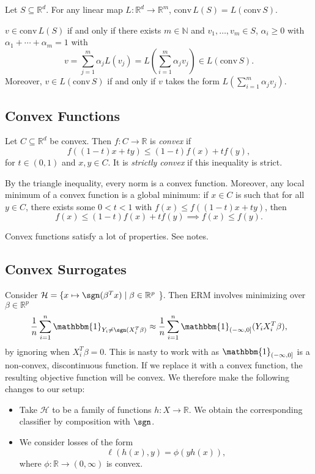 \documentclass[12pt]{article}
\begin{document}
\begin{lemma}
Let $S \subseteq \mathbb{R}^d$. For any linear map $L : \mathbb{R}^d \to \mathbb{R}^m$, $\mathrm{conv} \, L(S) = L(\mathrm{conv} \, S)$.
\end{lemma}

\begin{proofbox}
	$v \in \mathrm{conv} \, L(S)$ if and only if there exists $m \in \mathbb{N}$ and $v_1, \ldots, v_m \in S$, $\alpha_i \geq 0$ with $\alpha_1 + \cdots + \alpha_m = 1$ with
	\[
	v = \sum_{j = 1}^m \alpha_j L(v_j) = L \left( \sum_{i = 1}^m \alpha_j v_j \right) \in L(\mathrm{conv} \, S).
	\]
	Moreover, $v \in L(\mathrm{conv} \, S)$ if and only if $v$ takes the form $L(\sum_{i = 1}^m \alpha_j v_j)$.
\end{proofbox}

\subsection{Convex Functions}
\label{sub:convf}

Let $C \subseteq \mathbb{R}^d$ be convex. Then $f : C \to \mathbb{R}$ is \emph{convex} if
\[
f( (1 - t) x + t y) \leq (1 - t) f(x) + t f(y),
\]
for $t \in (0, 1)$ and $x, y \in C$. It is \emph{strictly convex} if this inequality is strict.

By the triangle inequality, every norm is a convex function. Moreover, any local minimum of a convex function is a global minimum: if $x \in C$ is such that for all $y \in C$, there exists some $0 < t < 1$ with $f(x) \leq f((1 - t)x + ty)$, then
\[
f(x) \leq (1 - t)f(x) + t f(y) \implies f(x) \leq f(y).
\]

Convex functions satisfy a lot of properties. See notes.

\subsection{Convex Surrogates}
\label{sub:conv_s}

Consider $\mathcal{H} = \{x \mapsto \sgn(\beta^T x)  \mid \beta \in \mathbb{R}^p$ \}. Then ERM involves minimizing over $\beta \in \mathbb{R}^p$
\[
	\frac{1}{n} \sum_{i = 1}^n \mathbbm{1}_{Y_i \neq \sgn (X_i^T \beta)} \approx \frac{1}{n} \sum_{i = 1}^n \mathbbm{1}_{(-\infty, 0]}(Y_i X_i^T \beta),
\]
by ignoring when $X_i^T \beta = 0$. This is nasty to work with as $\mathbbm{1}_{(-\infty, 0]}$ is a non-convex, discontinuous function. If we replace it with a convex function, the resulting objective function will be convex. We therefore make the following changes to our setup:
\begin{itemize}
	\item Take $\mathcal{H}$ to be a family of functions $h : X \to \mathbb{R}$. We obtain the corresponding classifier by composition with $\sgn$.
	\item We consider losses of the form
		\[
		\ell(h(x), y) = \phi(yh(x)),
		\]
		where $\phi : \mathbb{R} \to (0, \infty)$ is convex.
\end{itemize}
\end{document}
